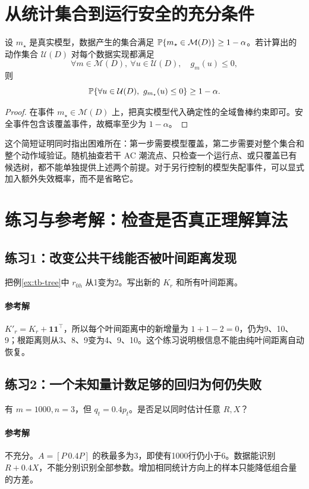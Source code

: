 \section{从统计集合到运行安全的充分条件}
\begin{proposition}[集合包含如何传递到全域约束]
设 $m_\star$ 是真实模型，数据产生的集合满足
$\mathbb{P}\{m_\star\in\mathcal M(D)\}\geq1-\alpha$。若计算出的动作集合 $\mathcal U(D)$ 对每个数据实现都满足
\begin{equation}
 \forall m\in\mathcal M(D),\ \forall u\in\mathcal U(D),\quad g_m(u)\leq0,
\end{equation}
则
\begin{equation}
 \Prob\{\forall u\in\mathcal U(D),\ g_{m_\star}(u)\leq0\}\geq1-\alpha.
\end{equation}
\end{proposition}
\begin{proof}
在事件 $m_\star\in\mathcal M(D)$ 上，把真实模型代入确定性的全域鲁棒约束即可。安全事件包含该覆盖事件，故概率至少为 $1-\alpha$。
\end{proof}
这个简短证明同时指出困难所在：第一步需要模型覆盖，第二步需要对整个集合和整个动作域验证。随机抽查若干 AC 潮流点、只检查一个运行点、或只覆盖已有候选树，都不能单独提供上述两个前提。对于另行控制的模型失配事件，可以显式加入额外失效概率，而不是省略它。

\section{练习与参考解：检查是否真正理解算法}
\subsection{练习1：改变公共干线能否被叶间距离发现}
把例\ref{ex:tb-tree}中 $r_{0h}$ 从1变为2。写出新的 $K_r$ 和所有叶间距离。
\paragraph{参考解} $K'_r=K_r+\mathbf1\mathbf1^\top$，所以每个叶间距离中的新增量为 $1+1-2=0$，仍为9、10、9；根距离则从3、8、9变为4、9、10。这个练习说明根信息不能由纯叶间距离自动恢复。

\subsection{练习2：一个未知量计数足够的回归为何仍失败}
有 $m=1000,n=3$，但 $q_t=0.4p_t$。是否足以同时估计任意 $R,X$？
\paragraph{参考解}不充分。$A=[P\ 0.4P]$ 的秩最多为3，即使有1000行仍小于6。数据能识别 $R+0.4X$，不能分别识别全部参数。增加相同统计方向上的样本只能降低组合量的方差。

